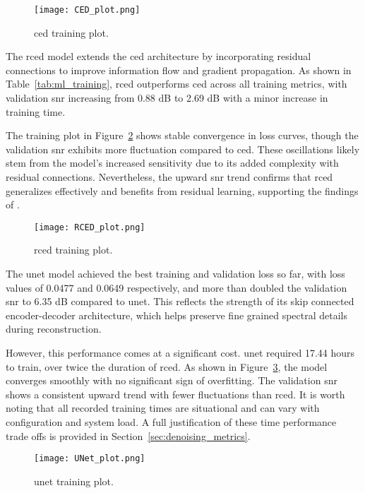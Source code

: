\begin{figure}[H]
    \centering
    \texttt{[image: CED\_plot.png]}
    \caption{\label{fig:ced_training_plot} \gls{ced} training plot.}
\end{figure}

The \gls{rced} model extends the \gls{ced} architecture by incorporating residual connections to improve information flow and gradient propagation. As shown in Table~\ref{tab:ml_training}, \gls{rced} outperforms \gls{ced} across all training metrics, with validation \gls{snr} increasing from 0.88 dB to 2.69 dB with a minor increase in training time.

The training plot in Figure~\ref{fig:rced_training_plot} shows stable convergence in loss curves, though the validation \gls{snr} exhibits more fluctuation compared to \gls{ced}. These oscillations likely stem from the model’s increased sensitivity due to its added complexity with residual connections. Nevertheless, the upward \gls{snr} trend confirms that \gls{rced} generalizes effectively and benefits from residual learning, supporting the findings of \cite{park2017acoustic}.

\begin{figure}[H]
    \centering
    \texttt{[image: RCED\_plot.png]}
    \caption{\label{fig:rced_training_plot} \gls{rced} training plot.}
\end{figure}

The \gls{unet} model achieved the best training and validation loss so far, with loss values of 0.0477 and 0.0649 respectively, and more than doubled the validation \gls{snr} to 6.35 dB compared to \gls{unet}. This reflects the strength of its skip connected encoder-decoder architecture, which helps preserve fine grained spectral details during reconstruction.

However, this performance comes at a significant cost. \gls{unet} required 17.44 hours to train, over twice the duration of \gls{rced}. As shown in Figure~\ref{fig:unet_training_plot}, the model converges smoothly with no significant sign of overfitting. The validation \gls{snr} shows a consistent upward trend with fewer fluctuations than \gls{rced}. It is worth noting that all recorded training times are situational and can vary with configuration and system load. A full justification of these time performance trade offs is provided in Section~\ref{sec:denoising_metrics}.

\begin{figure}[H]
    \centering
    \texttt{[image: UNet\_plot.png]}
    \caption{\label{fig:unet_training_plot} \gls{unet} training plot.}
\end{figure}

